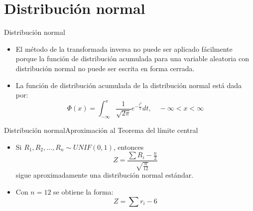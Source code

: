 \section{Distribución normal}

\begin{frame}{Distribución normal}
    \begin{itemize}
        \item El método de la transformada inversa no puede ser aplicado fácilmente porque la función de distribución acumulada para una variable aleatoria con distribución normal no puede ser escrita en forma cerrada.
        \item La función de distribución acumulada de la distribución normal está dada por:
        \begin{equation*}
            \Phi (x) = \int_{-\infty}^{x} \frac{1}{\sqrt{2\pi}} e^{-\frac{t^2}{2}}dt, \quad -\infty<x<\infty
        \end{equation*}
    \end{itemize}
\end{frame}

\begin{frame}{Distribución normal}{Aproximación al Teorema del límite central}
    \begin{itemize}
        \item Si $R_1, R_2, \dots, R_n \sim UNIF(0,1)$, entonces \begin{equation*}
            Z=\frac{\sum {R_i} - \frac{n}{2}}{\sqrt{\frac{n}{12}}}
        \end{equation*}
        sigue aproximadamente una distribución normal estándar. 
        \item Con $n=12$ se obtiene la forma:
        \begin{equation*}
            Z=\sum r_i - 6
        \end{equation*}
    \end{itemize}
\end{frame}

